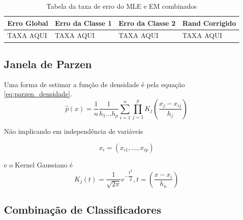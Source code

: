 \begin{table}[H]
\begin{center}
\begin{tabular}{|l|l|l|l|}
\hline
Erro Global	&	Erro da Classe 1	&	Erro da Classe 2	&	Rand Corrigido	\\
\hline %
TAXA AQUI	&		TAXA AQUI		&		TAXA AQUI		&	TAXA AQUI		\\
\hline
\end{tabular}%
\end{center}   %
\caption{Tabela da taxa de erro do MLE e EM combinados}
\label{tab:erro-mle-em}
\end{table}

\subsection{Janela de Parzen}
\label{subsec:exp-janeladeparzen}


Uma forma de estimar a função de densidade é pela equação \ref{eq:parzen_densidade}.
\begin{equation}
\label{eq:parzen_densidade}
\hat{p}(x) = \dfrac{1}{n} \dfrac{1}{h_1 \ldots h_p} \sum_{i = 1}^{n}\prod_{j = 1}^{p} K_j \left (\dfrac{x_j - x_{ij}}{h_j} \right )
\end{equation}

Não implicando em independência de variáveis

\begin{equation}
\label{eq:parzen_independencia}
x_i = \left (x_{i1}, \ldots, x_{ip} \right)
\end{equation}

e o Kernel Gaussiano é
\begin{equation}
\label{eq:kernel}
K_j(t) = \dfrac{1}{\sqrt{2\pi}} e^{- \dfrac{t^2}{2}}, t = \left (\dfrac{x - x_i}{h_n} \right)
\end{equation}

\subsection{Combinação de Classificadores}
\label{subsec:exp-combinacaodeclassificadores}








